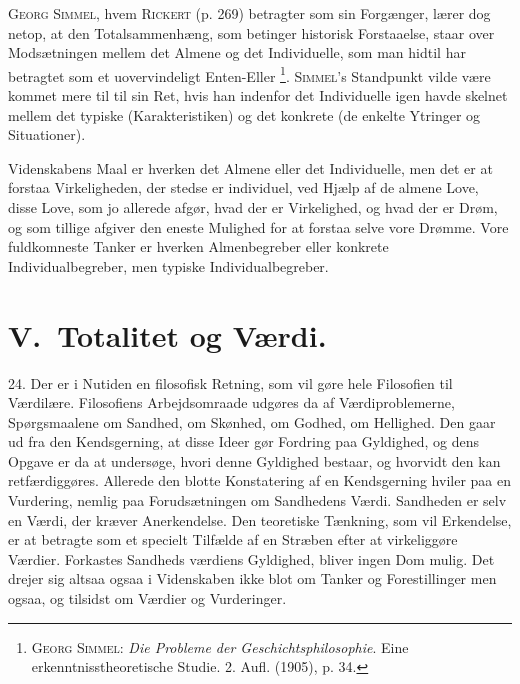 \documentclass[12pt]{article}
\newcommand{\opage}[1]{\marginnote{\footnotesize\textit{[#1]}}}
\begin{document}
\textsc{Georg Simmel}, hvem \textsc{Rickert} (p. 269) betragter som sin
Forgænger, lærer dog netop, at den Totalsammenhæng, som betinger historisk
Forstaaelse, staar over Modsætningen mellem det Almene og det Individuelle, som
man hidtil har betragtet som et uovervindeligt Enten-Eller%
\footnote{\textsc{Georg
Simmel}: \textit{Die Probleme der Geschichtsphilosophie}.
Eine erkenntnisstheoretische Studie. 2. Aufl. (1905), p. 34.}.
\textsc{Simmel}'s Standpunkt vilde være kommet mere til til sin Ret, hvis han
indenfor det Individuelle igen havde skelnet mellem det typiske (Karakteristiken)
og det konkrete (de enkelte Ytringer og Situationer).

Videnskabens Maal er hverken det Almene eller det Individuelle, men det er
at forstaa Virkeligheden, der stedse er individuel, ved Hjælp af de almene Love,
disse Love, som jo allerede afgør, hvad der er Virkelighed, og hvad der er Drøm,
og som tillige afgiver den eneste Mulighed for at forstaa selve vore Drømme. Vore
fuldkomneste Tanker er hverken Almenbegreber eller konkrete Individualbegreber,
men typiske Individualbegreber.

\section*{V.\ Totalitet og Værdi.}

24. Der er i Nutiden en filosofisk Retning, som vil gøre hele Filosofien til
Værdilære. Filosofiens Arbejdsomraade udgøres da af Værdiproblemerne,
Spørgsmaalene om Sandhed, om Skønhed, om Godhed, om Hellighed. Den gaar ud fra
den Kendsgerning, at disse Ideer gør Fordring paa Gyldighed, og dens Opgave er
da at undersøge, hvori denne Gyldighed bestaar, og hvorvidt den kan retfærdiggøres.
Allerede den blotte Konstatering af en Kendsgerning hviler paa en Vurdering, nemlig
paa Forudsætningen om Sandhedens Værdi. Sandheden er selv en Værdi, der kræver
Anerkendelse. Den teoretiske Tænkning, som vil Erkendelse, er at betragte som et
specielt Tilfælde af en Stræben efter at virkeliggøre Værdier. Forkastes Sandheds%
\setcounter{footnote}{0}%
\opage{67}værdiens Gyldighed, bliver ingen Dom mulig. Det drejer sig altsaa
ogsaa i Videnskaben ikke blot om Tanker og Forestillinger men ogsaa, og tilsidst
om Værdier og Vurderinger.
\end{document}
